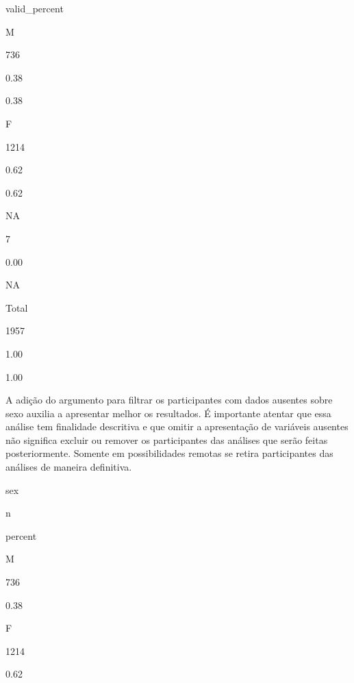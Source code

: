 \documentclass[
]{book}
\newenvironment{Shaded}{\begin{snugshade}}{\end{snugshade}}
\newcommand{\DataTypeTok}[1]{\textcolor[rgb]{0.13,0.29,0.53}{#1}}
\newcommand{\DecValTok}[1]{\textcolor[rgb]{0.00,0.00,0.81}{#1}}
\newcommand{\KeywordTok}[1]{\textcolor[rgb]{0.13,0.29,0.53}{\textbf{#1}}}
\newcommand{\NormalTok}[1]{#1}
\newcommand{\OperatorTok}[1]{\textcolor[rgb]{0.81,0.36,0.00}{\textbf{#1}}}
\newcommand{\StringTok}[1]{\textcolor[rgb]{0.31,0.60,0.02}{#1}}
\begin{document}
valid\_percent

M

736

0.38

0.38

F

1214

0.62

0.62

NA

7

0.00

NA

Total

1957

1.00

1.00

A adição do argumento para filtrar os participantes com dados ausentes sobre sexo auxilia a apresentar melhor os resultados. É importante atentar que essa análise tem finalidade descritiva e que omitir a apresentação de variáveis ausentes não significa excluir ou remover os participantes das análises que serão feitas posteriormente. Somente em possibilidades remotas se retira participantes das análises de maneira definitiva.

\begin{Shaded}
\end{Shaded}

sex

n

percent

M

736

0.38

F

1214

0.62
\end{document}
